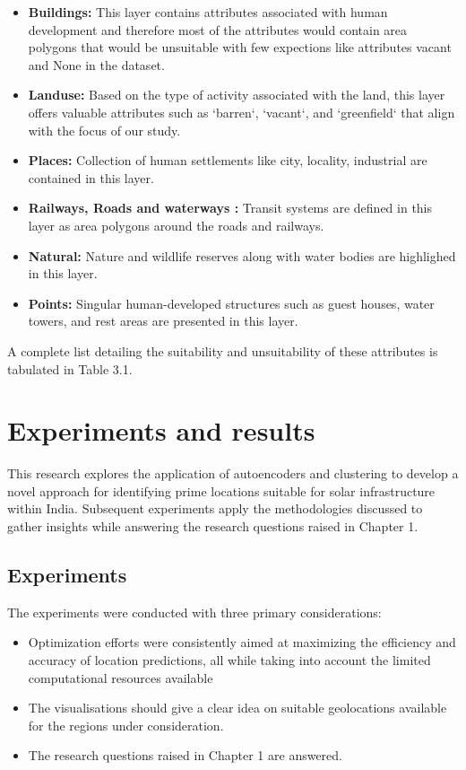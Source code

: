 \documentclass[a4paper,12pt]{Classes/RoboticsLaTeX}
\begin{document}
	\begin{itemize}
		\item \textbf{Buildings: } This layer contains attributes associated with human development and therefore most of the attributes would contain area polygons that would be unsuitable with few expections 
		like attributes vacant and None in the dataset.
		\item \textbf{Landuse: } Based on the type of activity associated with the land, this layer offers valuable attributes such as `barren`, `vacant`, and `greenfield` that align with the focus of our study.
		\item \textbf{Places: } Collection of human settlements like city, locality, industrial are contained in this layer.
		\item \textbf{Railways, Roads and waterways : } Transit systems are defined in this layer as area polygons around the roads and railways.
		\item \textbf{Natural: } Nature and wildlife reserves along with water bodies are highlighed in this layer.
		\item \textbf{Points: } Singular human-developed structures such as guest houses, water towers, and rest areas are presented in this layer.
	\end{itemize}

	A complete list detailing the suitability and unsuitability of these attributes is tabulated in Table 3.1.

	
	\chapter{Experiments and results}

	This research explores the application of autoencoders and clustering to develop a novel approach for identifying 
	prime locations suitable for solar infrastructure within India. Subsequent experiments apply the methodologies discussed 
	to gather insights while answering the research questions raised in Chapter 1. 

	\section{Experiments}

	The experiments were conducted with three primary considerations:

	\begin{itemize}
		\item  Optimization efforts were consistently aimed at maximizing the efficiency and accuracy of location predictions,
		all while taking into account the limited computational resources available
		\item The visualisations should give a clear idea on suitable geolocations available for the regions under consideration.
		\item The research questions raised in Chapter 1 are answered.
	\end{itemize}
\end{document}
